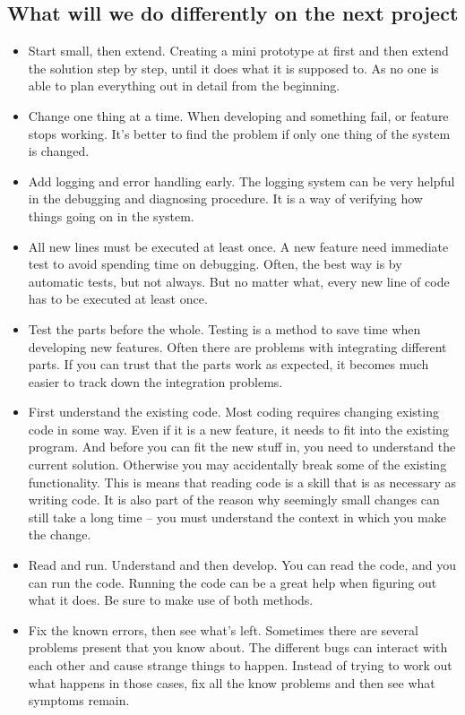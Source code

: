 \documentclass[runningheads]{llncs}
\begin{document}
\subsection{What will we do differently on the next project}
\begin{itemize}
  \item Start small, then extend. Creating a mini prototype at first and then extend the solution step by step, until it does what it is supposed to. As no one is able to plan everything out in detail from the beginning.
  \item Change one thing at a time. When developing and something fail, or feature stops working. It's better to find the problem if only one thing of the system is changed.
  \item Add logging and error handling early. The logging system can be very helpful in the debugging and diagnosing procedure. It is a way of verifying how things going on in the system.  
  \item All new lines must be executed at least once. A new feature need immediate test to avoid spending time on debugging. Often, the best way is by automatic tests, but not always. But no matter what, every new line of code has to be executed at least once.
  \item Test the parts before the whole. Testing is a method to save time when developing new features. Often there are problems with integrating different parts. If you can trust that the parts work as expected, it becomes much easier to track down the integration problems.
  \item First understand the existing code. Most coding requires changing existing code in some way. Even if it is a new feature, it needs to fit into the existing program. And before you can fit the new stuff in, you need to understand the current solution. Otherwise you may accidentally break some of the existing functionality. This is means that reading code is a skill that is as necessary as writing code. It is also part of the reason why seemingly small changes can still take a long time – you must understand the context in which you make the change.
  \item Read and run. Understand and then develop. You can read the code, and you can run the code. Running the code can be a great help when figuring out what it does. Be sure to make use of both methods.
  \item Fix the known errors, then see what’s left. Sometimes there are several problems present that you know about. The different bugs can interact with each other and cause strange things to happen. Instead of trying to work out what happens in those cases, fix all the know problems and then see what symptoms remain.

\end{itemize}
\end{document}
